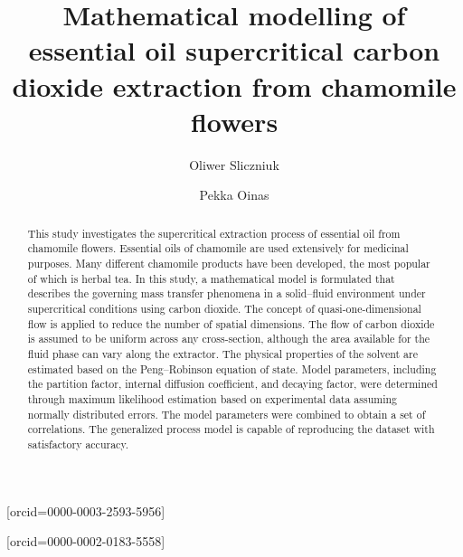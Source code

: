 \documentclass[a4paper,fleqn]{cas-dc}
\begin{document}
 
	
	\title[mode=title]{Mathematical modelling of essential oil supercritical carbon dioxide extraction from chamomile flowers} 
	
	
	\author[1]{Oliwer Sliczniuk}[orcid=0000-0003-2593-5956]
	\cormark[1]
	
	\author[1]{Pekka Oinas}[orcid=0000-0002-0183-5558]
	
	\address[1]{Aalto University, School of Chemical Engineering, Espoo, 02150, Finland}
	
	
	\begin{abstract}
		This study investigates the supercritical extraction process of essential oil from chamomile flowers. Essential oils of chamomile are used extensively for medicinal purposes. Many different chamomile products have been developed, the most popular of which is herbal tea. In this study, a mathematical model is formulated that describes the governing mass transfer phenomena in a solid--fluid environment under supercritical conditions using carbon dioxide. The concept of quasi-one-dimensional flow is applied to reduce the number of spatial dimensions. The flow of carbon dioxide is assumed to be uniform across any cross-section, although the area available for the fluid phase can vary along the extractor. The physical properties of the solvent are estimated based on the Peng--Robinson equation of state. Model parameters, including the partition factor, internal diffusion coefficient, and decaying factor, were determined through maximum likelihood estimation based on experimental data assuming normally distributed errors. The model parameters were combined to obtain a set of correlations. The generalized process model is capable of reproducing the dataset with satisfactory accuracy.
		
		
	\end{abstract}
	
\end{document}
